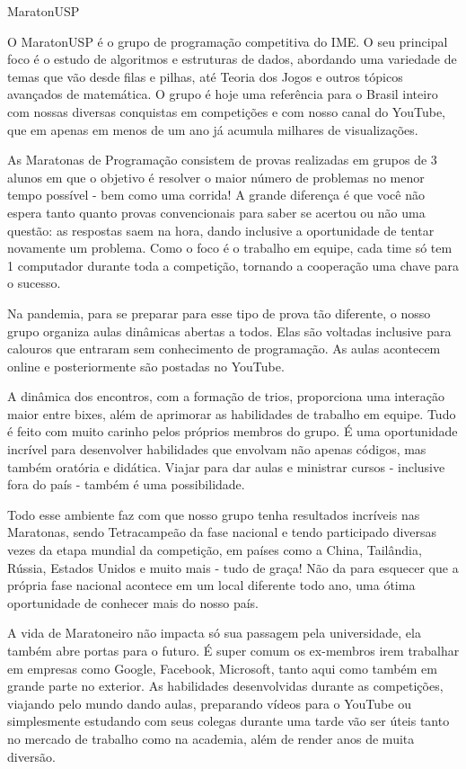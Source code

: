 \begin{subsecao}{MaratonUSP}

O MaratonUSP é o grupo de programação competitiva do IME. O seu principal foco é
o estudo de algoritmos e estruturas de dados, abordando uma variedade de temas
que vão desde filas e pilhas, até Teoria dos Jogos e outros tópicos avançados de
matemática. O grupo é hoje uma referência para o Brasil inteiro com nossas
diversas conquistas em competições e com nosso canal do YouTube, que em apenas
em menos de um ano já acumula milhares de visualizações.

As Maratonas de Programação consistem de provas realizadas em grupos de 3 alunos
em que o objetivo é resolver o maior número de problemas no menor tempo
possível - bem como uma corrida! A grande diferença é que você não espera tanto
quanto provas convencionais para saber se acertou ou não uma questão: as respostas
saem na hora, dando inclusive a oportunidade de tentar novamente um problema. Como 
o foco é o trabalho em equipe, cada time só tem 1 computador durante toda a
competição, tornando a cooperação uma chave para o sucesso.

Na pandemia, para se preparar para esse tipo de prova tão diferente, o nosso
grupo organiza aulas dinâmicas abertas a todos. Elas são voltadas inclusive
para calouros que entraram sem conhecimento de programação. As aulas acontecem
online e posteriormente são postadas no YouTube.

A dinâmica dos encontros, com a formação de trios, proporciona uma interação maior
entre bixes, além de aprimorar as habilidades de trabalho em equipe. Tudo é feito
com muito carinho pelos próprios membros do grupo. É uma oportunidade incrível para
desenvolver habilidades que envolvam não apenas códigos, mas também oratória e
didática. Viajar para dar aulas e ministrar cursos - inclusive fora do país - também
é uma possibilidade.

Todo esse ambiente faz com que nosso grupo tenha resultados incríveis nas Maratonas,
sendo Tetracampeão da fase nacional e tendo participado diversas vezes da etapa
mundial da competição, em países como a China, Tailândia, Rússia, Estados Unidos
e muito mais - tudo de graça! Não da para esquecer que a própria fase nacional
acontece em um local diferente todo ano, uma ótima oportunidade de conhecer mais
do nosso país.

A vida de Maratoneiro não impacta só sua passagem pela universidade, ela também
abre portas para o futuro. É super comum os ex-membros irem trabalhar em empresas
como Google, Facebook, Microsoft, tanto aqui como também em grande parte no
exterior. As habilidades desenvolvidas durante as competições, viajando pelo
mundo dando aulas, preparando vídeos para o YouTube ou simplesmente estudando
com seus colegas durante uma tarde vão ser úteis tanto no mercado de trabalho
como na academia, além de render anos de muita diversão.


\end{subsecao}
